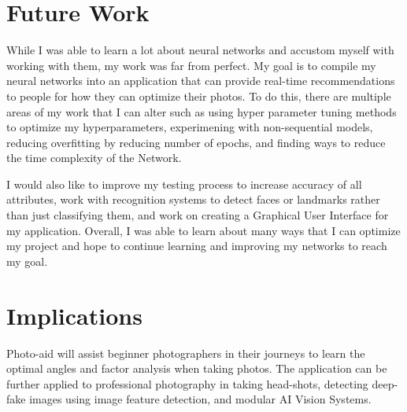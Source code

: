 \documentclass{article}
\begin{document}
\section{Future Work}

While I was able to learn a lot about neural networks and accustom myself with working with them, my work was far from perfect. My goal is to compile my neural networks into an application that can provide real-time recommendations to people for how they can optimize their photos. To do this, there are multiple areas of my work that I can alter such as using hyper parameter tuning methods to optimize my hyperparameters, experimening with non-sequential models, reducing overfitting by reducing number of epochs, and finding ways to reduce the time complexity of the Network. 

I would also like to improve my testing process to increase accuracy of all attributes, work with recognition systems to detect faces or landmarks rather than just classifying them, and work on creating a Graphical User Interface for my application. Overall, I was able to learn about many ways that I can optimize my project and hope to continue learning and improving my networks to reach my goal. 


\section{Implications}
Photo-aid will assist beginner photographers in their journeys to learn the optimal angles and factor analysis when taking photos. The application can be further applied to professional photography in taking head-shots, detecting deep-fake images using image feature detection, and modular AI Vision Systems. 

\newpage
\nocite{*}
\printbibliography
\end{document}
